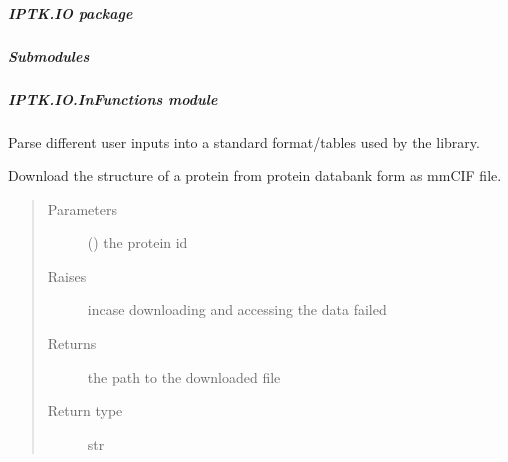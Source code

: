 \documentclass[letterpaper,10pt,english]{sphinxmanual}
\begin{document}
\subparagraph{IPTK.IO package}
\label{\detokenize{IPTK.IO:iptk-io-package}}\label{\detokenize{IPTK.IO::doc}}

\subparagraph{Submodules}
\label{\detokenize{IPTK.IO:submodules}}

\subparagraph{IPTK.IO.InFunctions module}
\label{\detokenize{IPTK.IO:module-IPTK.IO.InFunctions}}\label{\detokenize{IPTK.IO:iptk-io-infunctions-module}}
Parse different user inputs into a standard format/tables used by the library.

\begin{fulllineitems}
\label{\detokenize{IPTK.IO:IPTK.IO.InFunctions.download_pdb_entry}}
Download the structure of a protein from protein databank form as mmCIF file.
\begin{quote}\begin{description}
\item[{Parameters}] \leavevmode
{} () \textendash{} the protein id

\item[{Raises}] \leavevmode
{} \textendash{} incase downloading and accessing the data failed

\item[{Returns}] \leavevmode
the path to the downloaded file

\item[{Return type}] \leavevmode
str

\end{description}\end{quote}

\end{fulllineitems}

\end{document}
